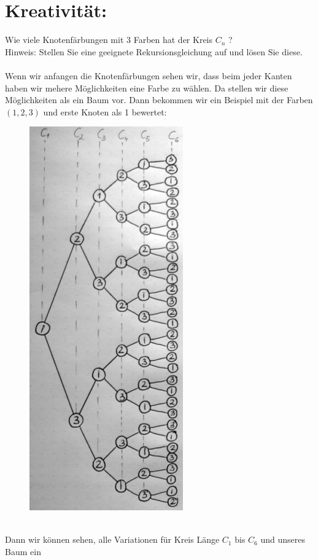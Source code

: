     \section*{Kreativität:} Wie viele Knotenfärbungen mit 3 Farben hat der Kreis $C_n$ ?\\
        Hinweis: Stellen Sie eine geeignete Rekursionsgleichung auf und lösen Sie diese.\\\\
        Wenn wir anfangen die Knotenfärbungen sehen wir, dass beim jeder Kanten haben wir mehere 
        Möglichkeiten eine Farbe zu wählen. Da stellen wir diese Möglichkeiten als ein Baum vor. 
        Dann bekommen wir ein Beispiel mit der Farben $(1,2,3)$ und erste Knoten als 1 bewertet:
        \begin{figure}
            \includegraphics[width=1\linewidth]{baum_kreativ}
        \end{figure}\\
        Dann wir können sehen, alle Variationen für Kreis Länge $C_1$ bis $C_6$ und unseres Baum ein